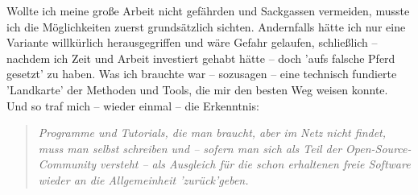 Wollte ich meine große Arbeit nicht gefährden und Sackgassen vermeiden, musste
ich die Möglichkeiten zuerst grundsätzlich sichten. Andernfalls hätte ich nur
eine Variante willkürlich herausgegriffen und wäre Gefahr gelaufen, schließlich
-- nachdem ich Zeit und Arbeit investiert gehabt hätte -- doch 'aufs falsche
Pferd gesetzt' zu haben. Was ich brauchte war -- sozusagen -- eine technisch
fundierte 'Landkarte' der Methoden und Tools, die mir den besten Weg weisen
konnte. Und so traf mich -- wieder einmal -- die Erkenntnis:

\begin{quote}\textit{Programme und Tutorials, die man braucht, aber im Netz
nicht findet, muss man selbst schreiben und -- sofern man sich als Teil der
Open-Source-Community versteht -- als Ausgleich für die schon erhaltenen
freie Software wieder an die  Allgemeinheit 'zurück'geben.}
\end{quote}



%
